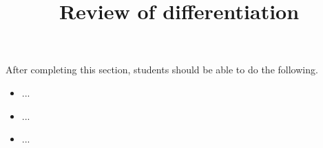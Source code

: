 \documentclass{ximera}
\title{Review of differentiation}
\begin{document}
\begin{abstract} 
\end{abstract}

\maketitle

\begin{sectionOutcomes}
After completing this section, students should be able to do the following.

\begin{itemize}
	\item ...
	\item ...
	\item ...
\end{itemize}
\end{sectionOutcomes}
\end{document}
